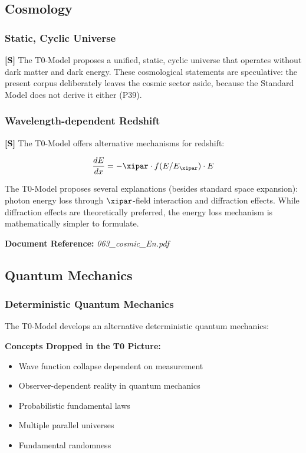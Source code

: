 \subsection{Cosmology}

\subsubsection{Static, Cyclic Universe}

\textbf{[S]} The T0-Model proposes a unified, static, cyclic universe that operates without dark matter and dark energy. These cosmological statements are speculative: the present corpus deliberately leaves the cosmic sector aside, because the Standard Model does not derive it either (P39).

\subsubsection{Wavelength-dependent Redshift}

\textbf{[S]} The T0-Model offers alternative mechanisms for redshift:

\begin{equation}
	\frac{dE}{dx} = -\xipar \cdot f(E/E_\xipar) \cdot E
\end{equation}

The T0-Model proposes several explanations (besides standard space expansion): photon energy loss through $\xipar$-field interaction and diffraction effects. While diffraction effects are theoretically preferred, the energy loss mechanism is mathematically simpler to formulate.

\textbf{Document Reference:} \textit{063\_cosmic\_En.pdf}

\subsection{Quantum Mechanics}

\subsubsection{Deterministic Quantum Mechanics}

The T0-Model develops an alternative deterministic quantum mechanics:

\textbf{Concepts Dropped in the T0 Picture:}
\begin{itemize}
	\item Wave function collapse dependent on measurement
	\item Observer-dependent reality in quantum mechanics
	\item Probabilistic fundamental laws
	\item Multiple parallel universes
	\item Fundamental randomness
\end{itemize}

